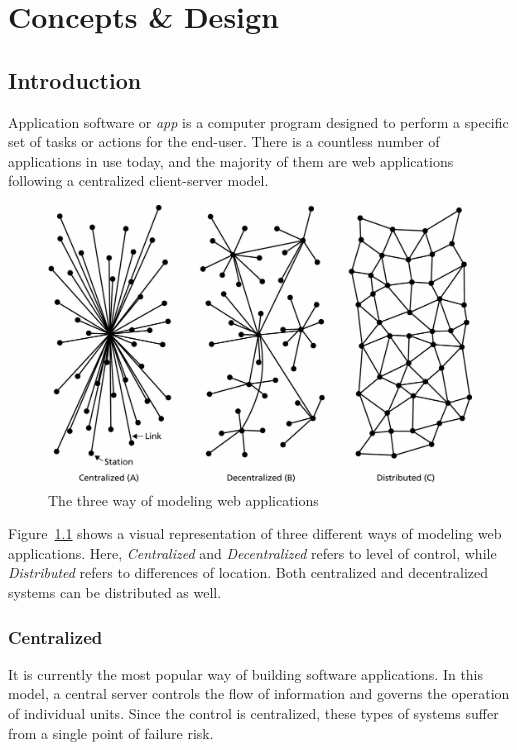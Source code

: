 \chapter{Concepts \& Design}\label{chapter::app-concepts-design}

\section{Introduction}
	Application software or \textit{app} is a computer program designed to perform a specific set of tasks or actions for the end-user. There is a countless number of applications in use today, and the majority of them are web applications following a centralized client-server model\cite{raval2016decentralized}.
	
	\begin{figure}[h]
		\includegraphics[width=\linewidth]{figures/network-models}
		\caption{\label{fig:applications} The three way of modeling web applications}
	\end{figure}
	
	Figure~\ref{fig:applications} shows a visual representation of three different ways of modeling web applications\cite{baran1964distributed}. Here, \textit{Centralized} and \textit{Decentralized} refers to level of control, while \textit{Distributed} refers to differences of location. Both centralized and decentralized systems can be distributed as well.
	
	\subsection{Centralized}
	It is currently the most popular way of building software applications. In this model, a central server controls the flow of information and governs the operation of individual units. Since the control is centralized, these types of systems suffer from a single point of failure risk.
	
